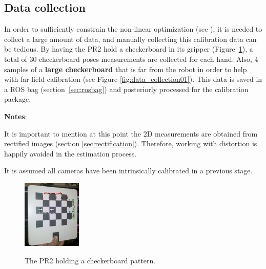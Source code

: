 \subsection{Data collection}

In order to sufficiently constrain the non-linear optimization (see \cite{pr2_calibration_paper}), it is needed to collect a large amount of data, and manually collecting this calibration data can be tedious. By having the PR2 hold a checkerboard in its gripper (Figure~\ref{fig:pr2_holdind_cb}), a total of 30 checkerboard poses measurements are collected for each hand. Also, 4 samples of a \textbf{large checkerboard} that is far from the robot in order to help with far-field calibration (see Figure \ref{fig:data_collection01}). This data is saved in a ROS bag (section~\ref{sec:rosbag}) and posteriorly processed for the calibration package.

\noindent

\textbf{Notes}:
\begin{itemize*}
  \item It is important to mention at this point the 2D measurements are obtained from rectified images (section \ref{sec:rectification}). Therefore, working with distortion is happily avoided in the estimation process.
  \item It is assumed all cameras have been intrinsically calibrated in a previous stage.
\end{itemize*}


\begin{figure}[!htbp]
  \centering
  \subfigure
  {
    \includegraphics[width=0.25\textwidth]{images/checkerboard01.png}
  }
  \caption{The PR2 holding a checkerboard pattern.}
 \label{fig:pr2_holdind_cb}
\end{figure}


